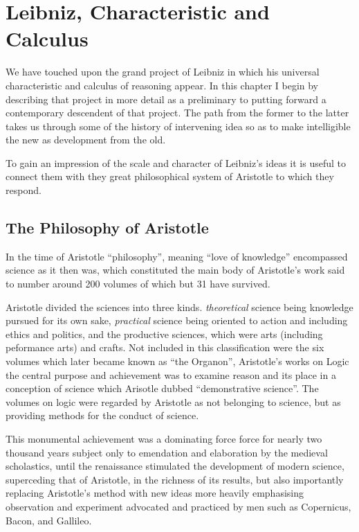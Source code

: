 
\chapter{Leibniz, Characteristic and Calculus}\label{Leibniz}

We have touched upon the grand project of Leibniz in which his universal characteristic
and calculus of reasoning appear.
In this chapter I begin by describing that project in more detail as a preliminary
to putting forward a contemporary descendent of that project.
The path from the former to the latter takes us through some of the history of
intervening idea so as to make intelligible the new as development from the old.

To gain an impression of the scale and character of Leibniz's ideas it is useful to connect them with
they great philosophical system of Aristotle to which they respond.

\section{The Philosophy of Aristotle}

In the time of Aristotle ``philosophy'', meaning ``love of knowledge'' encompassed science as
it then was, which constituted the main body of Aristotle's work said to number around 200 volumes
of which but 31 have survived.

Aristotle divided the sciences into three kinds.
\emph{theoretical} science being knowledge pursued for 
its own sake, \emph{practical} science being oriented to action and including ethics and politics, and
the productive sciences, which were arts (including peformance arts) and crafts.
Not included in this classification were the six volumes which later became known as ``the Organon'', Aristotle's
works on Logic the central purpose and achievement was to examine reason and its place in a conception of
science which Arisotle dubbed ``demonstrative science''.
The volumes on logic were regarded by Aristotle as not belonging to science, but as providing
methods for the conduct of science.

This monumental achievement was a dominating force force for nearly two thousand years
subject only to emendation and elaboration by the medieval scholastics, until the renaissance
stimulated the development of modern science, superceding that of Aristotle, in the richness
of its results, but also importantly replacing Aristotle's method with new ideas more heavily
emphasising observation and experiment advocated and practiced by men such as Copernicus, Bacon,
and Gallileo.

